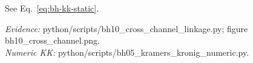 \begin{theorem}
\noindent See Eq.~\eqref{eq:bh-kk-static}.
\end{theorem}
\noindent\textit{Evidence:} python/scripts/bh10_cross_channel_linkage.py; figure bh10_cross_channel.png.\\
\noindent\textit{Numeric KK:} python/scripts/bh05_kramers_kronig_numeric.py.
